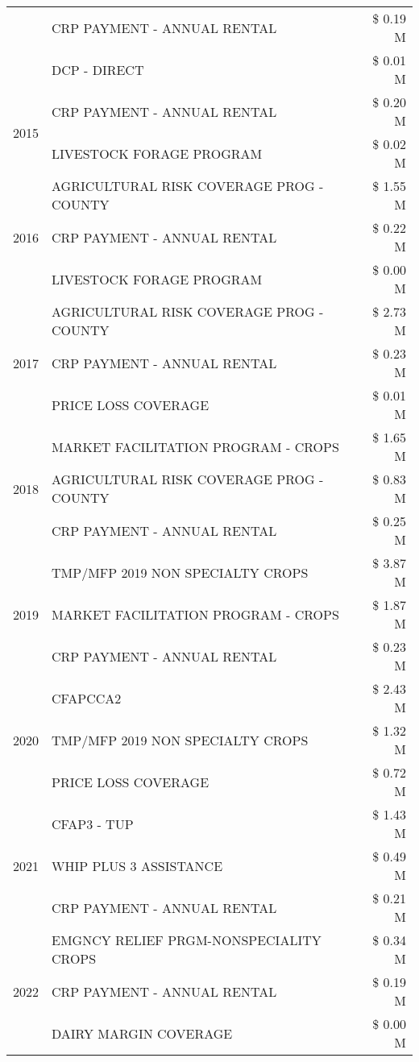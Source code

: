 \begin{tabular}{llr}
 & CRP PAYMENT - ANNUAL RENTAL & \$ 0.19 M \\
 & DCP - DIRECT & \$ 0.01 M \\
\cline{1-3}
\multirow[t]{2}{*}{2015} & CRP PAYMENT - ANNUAL RENTAL & \$ 0.20 M \\
 & LIVESTOCK FORAGE PROGRAM & \$ 0.02 M \\
\cline{1-3}
\multirow[t]{3}{*}{2016} & AGRICULTURAL RISK COVERAGE PROG - COUNTY & \$ 1.55 M \\
 & CRP PAYMENT - ANNUAL RENTAL & \$ 0.22 M \\
 & LIVESTOCK FORAGE PROGRAM & \$ 0.00 M \\
\cline{1-3}
\multirow[t]{3}{*}{2017} & AGRICULTURAL RISK COVERAGE PROG - COUNTY & \$ 2.73 M \\
 & CRP PAYMENT - ANNUAL RENTAL & \$ 0.23 M \\
 & PRICE LOSS COVERAGE & \$ 0.01 M \\
\cline{1-3}
\multirow[t]{3}{*}{2018} & MARKET FACILITATION PROGRAM - CROPS & \$ 1.65 M \\
 & AGRICULTURAL RISK COVERAGE PROG - COUNTY & \$ 0.83 M \\
 & CRP PAYMENT - ANNUAL RENTAL & \$ 0.25 M \\
\cline{1-3}
\multirow[t]{3}{*}{2019} & TMP/MFP 2019 NON SPECIALTY CROPS & \$ 3.87 M \\
 & MARKET FACILITATION PROGRAM - CROPS & \$ 1.87 M \\
 & CRP PAYMENT - ANNUAL RENTAL & \$ 0.23 M \\
\cline{1-3}
\multirow[t]{3}{*}{2020} & CFAPCCA2 & \$ 2.43 M \\
 & TMP/MFP 2019 NON SPECIALTY CROPS & \$ 1.32 M \\
 & PRICE LOSS COVERAGE & \$ 0.72 M \\
\cline{1-3}
\multirow[t]{3}{*}{2021} & CFAP3 - TUP & \$ 1.43 M \\
 & WHIP PLUS 3 ASSISTANCE & \$ 0.49 M \\
 & CRP PAYMENT - ANNUAL RENTAL & \$ 0.21 M \\
\cline{1-3}
\multirow[t]{3}{*}{2022} & EMGNCY RELIEF PRGM-NONSPECIALITY CROPS & \$ 0.34 M \\
 & CRP PAYMENT - ANNUAL RENTAL & \$ 0.19 M \\
 & DAIRY MARGIN COVERAGE & \$ 0.00 M \\
\cline{1-3}
\bottomrule
\end{tabular}
